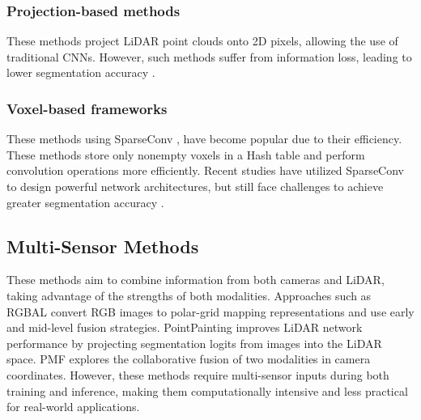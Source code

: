 \documentclass[10pt,twocolumn,letterpaper]{article}
\begin{document}
\subsubsection{Projection-based methods}
These methods project LiDAR point clouds onto 2D pixels, allowing the use of traditional CNNs. However, such methods suffer from information loss, leading to lower segmentation accuracy \cite{lawin2017deep, boulch2017unstructured, tatarchenko2018tangent,wu2018squeezeseg,wu2019squeezesegv2,liong2020amvnet}.
\subsubsection{Voxel-based frameworks}
These methods using SparseConv \cite{SparseConv}, have become popular due to their efficiency. These methods store only nonempty voxels in a Hash table and perform convolution operations more efficiently. Recent studies have utilized SparseConv \cite{SparseConv} to design powerful network architectures, but still face challenges to achieve greater segmentation accuracy \cite{zhou2020cylinder3d,cheng20212}.
\subsection{Multi-Sensor Methods}
These methods aim to combine information from both cameras and LiDAR, taking advantage of the strengths of both modalities. 
Approaches such as RGBAL \cite{el2019rgb} convert RGB images to polar-grid mapping representations and use early and mid-level fusion strategies. 
PointPainting \cite{vora2020pointpainting}  improves LiDAR network performance by projecting segmentation logits from images into the LiDAR space. 
PMF \cite{zhuang2021perception} explores the collaborative fusion of two modalities in camera coordinates. However, these methods require multi-sensor inputs during both training and inference, making them computationally intensive and less practical for real-world applications.\cite{krispel2020fuseseg,el2019rgb,meyer2019sensor,vora2020pointpainting}
\end{document}
